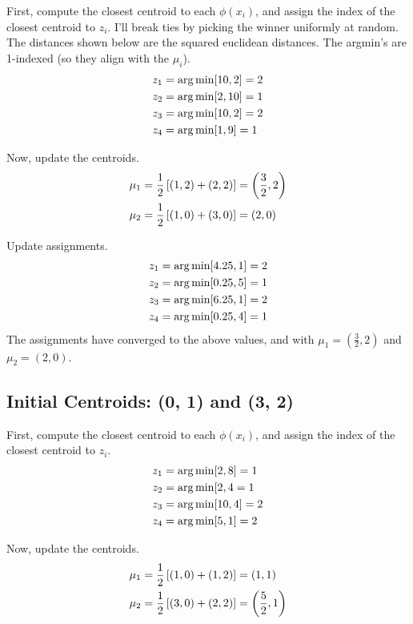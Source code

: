 \documentclass[11pt]{article}
\begin{document}
First, compute the closest centroid to each $\phi(x_i)$, and assign the index of the closest centroid to $z_i$. I'll break ties by picking the winner uniformly at random. The distances shown below are the squared euclidean distances. The argmin's are 1-indexed (so they align with the $\mu_i$). 
\begin{align}
	z_1 &= \operatorname*{arg\,min} [ 10, 2 ]= 2 \\
	z_2 &= \operatorname*{arg\,min} [2, 10] = 1 \\
	z_3 &= \operatorname*{arg\,min} [10, 2] = 2 \\
	z_4 &= \operatorname*{arg\,min} [1, 9] = 1
\end{align}

Now, update the centroids. 
\begin{align}
	\mu_1 &= \frac{1}{2} \left[ (1, 2) + (2, 2) \right] = \left( \frac{3}{2}, 2 \right) \\
	\mu_2 &= \frac{1}{2} \left[ (1, 0) + (3, 0) \right] = \left( 2, 0 \right)
\end{align}

Update assignments. 
\begin{align}
	z_1 &= \operatorname*{arg\,min} [ 4.25, 1 ]= 2 \\
	z_2 &= \operatorname*{arg\,min} [ 0.25, 5 ] = 1 \\
	z_3 &= \operatorname*{arg\,min} [6.25, 1 ] = 2 \\
	z_4 &= \operatorname*{arg\,min} [0.25, 4] = 1
\end{align}
The assignments have converged to the above values, and with $\mu_1= \left( \frac{3}{2}, 2 \right)$ and $\mu_2 = \left( 2, 0 \right)$. 



\subsection*{Initial Centroids: (0, 1) and (3, 2)}

First, compute the closest centroid to each $\phi(x_i)$, and assign the index of the closest centroid to $z_i$.
\begin{align}
z_1 &= \operatorname*{arg\,min} [ 2, 8 ]= 1 \\
z_2 &= \operatorname*{arg\,min} [2, 4 = 1 \\
z_3 &= \operatorname*{arg\,min} [10, 4] = 2 \\
z_4 &= \operatorname*{arg\,min} [5, 1] = 2
\end{align}

Now, update the centroids. 
\begin{align}
\mu_1 &= \frac{1}{2} \left[ (1, 0) + (1, 2) \right] = \left( 1, 1 \right) \\
\mu_2 &= \frac{1}{2} \left[ (3, 0) + (2, 2) \right] = \left( \frac{5}{2}, 1 \right)
\end{align}
\end{document}
